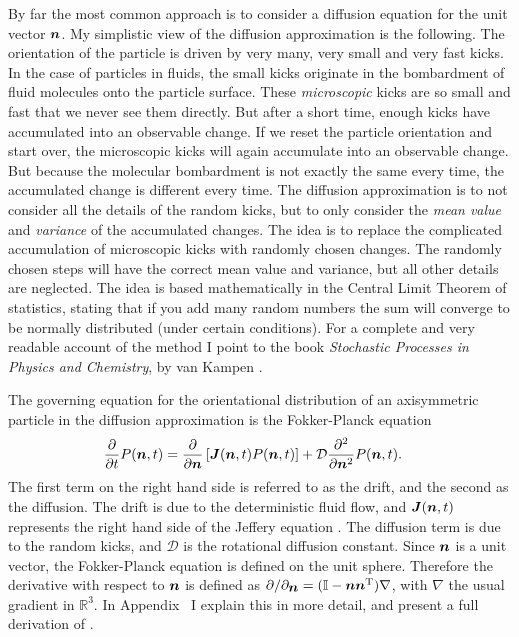 \documentclass[thesis.tex]{subfiles}
\begin{document}
By far the most common approach is to consider a diffusion equation for the unit vector $\mbox{\boldmath$n$}$. My simplistic view of the diffusion approximation is the following. The orientation of the particle is driven by very many, very small and very fast kicks. In the case of particles in fluids, the small kicks originate in the bombardment of fluid molecules onto the particle surface. These \emph{microscopic} kicks are so small and fast that we never see them directly. But after a short time, enough kicks have accumulated into an observable change. If we reset the particle orientation and start over, the microscopic kicks will again accumulate into an observable change. But because the molecular bombardment is not exactly the same every time, the accumulated change is different every time. The diffusion approximation is to not consider all the details of the random kicks, but to only consider the \emph{mean value} and \emph{variance} of the accumulated changes. The idea is to replace the complicated accumulation of microscopic kicks with randomly chosen changes. The randomly chosen steps will have the correct mean value and variance, but all other details are neglected. The idea is based mathematically in the Central Limit Theorem of statistics, stating that if you add many random numbers the sum will converge to be normally distributed (under certain conditions). For a complete and very readable account of the method I point to the book \emph{Stochastic Processes in Physics and Chemistry}, by van Kampen \cite{kampen2007}.

The governing equation for the orientational distribution of an axisymmetric particle in the diffusion approximation is the Fokker-Planck equation
\begin{align}
	\frac{\partial}{\partial t}P(\ve n, t) &= \frac{\partial}{\partial \ve n}\left[\ve J (\ve n, t)P(\ve n, t)\right] + \mathcal D \frac{\partial^2}{\partial \ve n^2}P(\ve n, t).\eqnlab{fpejeff}
\end{align}
The first term on the right hand side is referred to as the drift, and the second as the diffusion. The drift is due to the deterministic fluid flow, and $\mbox{\boldmath$J$}(\mbox{\boldmath$n$}, t)$ represents the right hand side of the Jeffery equation . The diffusion term is due to the random kicks, and $\mathcal D$ is the rotational diffusion constant. Since $\mbox{\boldmath$n$}$ is a unit vector, the Fokker-Planck equation is defined on the unit sphere. Therefore the derivative with respect to $\mbox{\boldmath$n$}$ is defined as $\partial/\partial_{\mbox{\boldmath$n$}} = (\mathbb{I}-\mbox{\boldmath$n$}\mbox{\boldmath$n$}^{\mathrm T})\nabla$, with $\nabla$ the usual gradient in $\mathbb R^3$. In Appendix~ I explain this in more detail, and present a full derivation of . 
\end{document}
